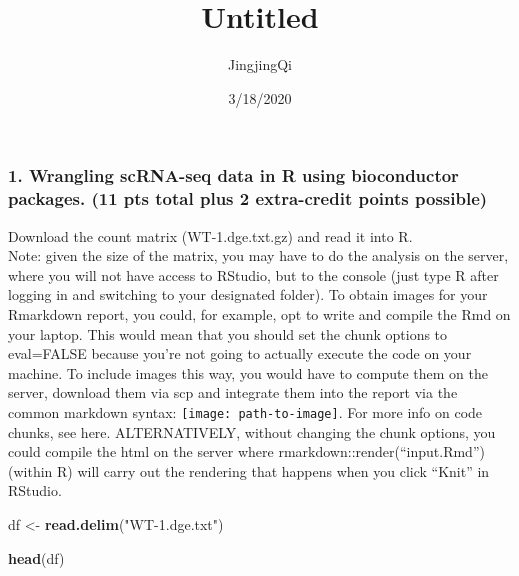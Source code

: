 \documentclass[]{article}
\title{Untitled}
\author{JingjingQi}
\date{3/18/2020}
\newenvironment{Shaded}{\begin{snugshade}}{\end{snugshade}}
\newcommand{\KeywordTok}[1]{\textcolor[rgb]{0.13,0.29,0.53}{\textbf{#1}}}
\newcommand{\StringTok}[1]{\textcolor[rgb]{0.31,0.60,0.02}{#1}}
\newcommand{\NormalTok}[1]{#1}
\begin{document}
\maketitle

\subsubsection{1. Wrangling scRNA-seq data in R using bioconductor
packages. (11 pts total plus 2 extra-credit points
possible)}\label{wrangling-scrna-seq-data-in-r-using-bioconductor-packages.-11-pts-total-plus-2-extra-credit-points-possible}

Download the count matrix (WT-1.dge.txt.gz) and read it into R.\\
Note: given the size of the matrix, you may have to do the analysis on
the server, where you will not have access to RStudio, but to the
console (just type R after logging in and switching to your designated
folder). To obtain images for your Rmarkdown report, you could, for
example, opt to write and compile the Rmd on your laptop. This would
mean that you should set the chunk options to eval=FALSE because you're
not going to actually execute the code on your machine. To include
images this way, you would have to compute them on the server, download
them via scp and integrate them into the report via the common markdown
syntax: \texttt{[image: path-to-image]}. For more info on code chunks,
see here. ALTERNATIVELY, without changing the chunk options, you could
compile the html on the server where rmarkdown::render(``input.Rmd'')
(within R) will carry out the rendering that happens when you click
``Knit'' in RStudio.

\begin{Shaded}
\begin{Highlighting}[]
\NormalTok{df <-}\StringTok{ }\KeywordTok{read.delim}\NormalTok{(}\StringTok{"WT-1.dge.txt"}\NormalTok{)}
\end{Highlighting}
\end{Shaded}

\begin{Shaded}
\begin{Highlighting}[]
\KeywordTok{head}\NormalTok{(df)}
\end{Highlighting}
\end{Shaded}
\end{document}
